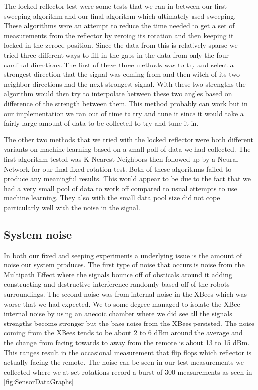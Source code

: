 The locked reflector test were some tests that we ran in between our first sweeping algorithm and our final algorithm which ultimately used sweeping. These algorithms were an attempt to reduce the time needed to get a set of measurements from the reflector by zeroing its rotation and then keeping it locked in the zeroed position.  Since the data from this is relatively sparse we tried three different ways to fill in the gaps in the data from only the four cardinal directions. The first of these three methods was to try and select a strongest direction that the signal was coming from and then witch of its two neighbor directions had the next strongest signal. With these two strengths the algorithm would then try to interpolate between these two angles based on difference of the strength between them. This method probably can work but in our implementation we ran out of time to try and tune it since it would take a fairly large amount of data to be collected to try and tune it in.

\vspace*{12pt}
\noindent
The other two methods that we tried with the locked reflector were both different variants on machine learning based on a small poll of data we had collected. The first algorithm tested was K Nearest Neighbors then followed up by a Neural Network for our final fixed rotation test.  Both of these algorithms failed to produce any meaningful results.  This would appear to be due to the fact that we had a very small pool of data to work off compared to usual attempts to use machine learning. They also with the small data pool size did not cope particularly well with the noise in the signal.

\subsection{System noise}

In both our fixed and seeping experiments a underlying issue is the amount of noise our system produces.  The first type of noise that occurs is noise from the Multipath Effect where the signals bounce off of obsticals around it adding constructing and destructive interference randomly based off of the robots surroundings.  The second noise was from internal noise in the XBees which was worse that we had expected.  We to some degree managed to isolate the XBee internal noise by using an anecoic chamber where we did see all the signals strengths become stronger but the base noise from the XBees persisted. The noise coming from the XBees tends to be about 2 to 6 dBm around the average and the change from facing towards to away from the remote is about 13 to 15 dBm.  This ranges result in the occasional measurement that flip flops which reflector is actually facing the remote. The noise can be seen in our test measurements we collected where we at set rotations record a burst of 300 measurements as seen in \autoref{fig:SensorDataGraphs}

